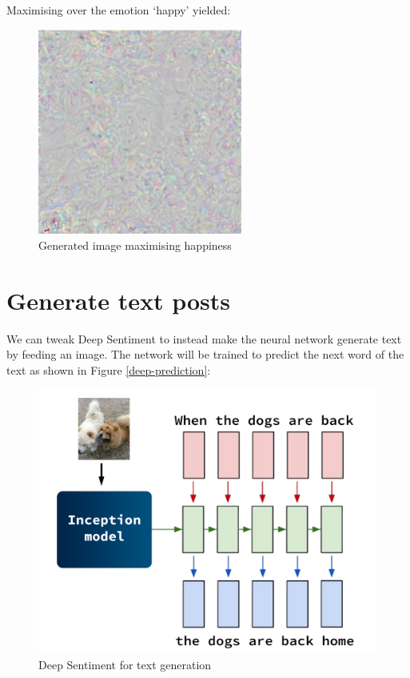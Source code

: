Maximising over the emotion `happy' yielded:

\begin{figure}[H]
    \centering
    \includegraphics[width=0.6\textwidth]{Images/happy_gradient.png}
    \caption{Generated image maximising happiness}
\end{figure}

\newpage
\section{Generate text posts}

We can tweak Deep Sentiment to instead make the neural network generate text by feeding an image. The network will be trained to predict the next word of the text as shown in Figure \ref{deep-prediction}:

\begin{figure}[H]
    \centering
    \includegraphics[width=\textwidth]{Images/deep-prediction.jpg}
    \caption{Deep Sentiment for text generation}
\end{figure}













